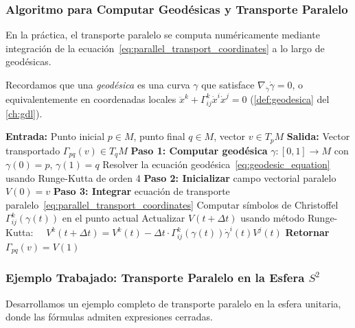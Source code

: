 \subsubsection{Algoritmo para Computar Geodésicas y Transporte Paralelo}

En la práctica, el transporte paralelo se computa numéricamente mediante integración de la ecuación~\eqref{eq:parallel_transport_coordinates} a lo largo de geodésicas.

Recordamos que una \textit{geodésica} es una curva $\gamma$ que satisface $\nabla_{\dot{\gamma}} \dot{\gamma} = 0$, o equivalentemente en coordenadas locales $\ddot{x}^k + \Gamma^k_{ij} \dot{x}^i \dot{x}^j = 0$ (\autoref{def:geodesica} del \autoref{ch:gdl}).\label{def:geodesic_attention}\label{eq:geodesic_equation}

\begin{algorithm}[H]
\caption{Cálculo de Transporte Paralelo en Variedades Riemannianas}
\label{alg:parallel_transport_computation}
\begin{algorithmic}[1]
    \State \textbf{Entrada:} Punto inicial $p \in M$, punto final $q \in M$, vector $v \in T_p M$
    \State \textbf{Salida:} Vector transportado $\Gamma_{pq}(v) \in T_q M$
    \State
    \State \textbf{Paso 1: Computar geodésica} $\gamma: [0,1] \to M$ con $\gamma(0) = p$, $\gamma(1) = q$
    \State Resolver la ecuación geodésica~\eqref{eq:geodesic_equation} usando Runge-Kutta de orden 4
    \State
    \State \textbf{Paso 2: Inicializar} campo vectorial paralelo $V(0) = v$
    \State
    \State \textbf{Paso 3: Integrar} ecuación de transporte paralelo~\eqref{eq:parallel_transport_coordinates}
        \State Computar símbolos de Christoffel $\Gamma^k_{ij}(\gamma(t))$ en el punto actual
        \State Actualizar $V(t + \Delta t)$ usando método Runge-Kutta:
        \State $\quad V^k(t + \Delta t) = V^k(t) - \Delta t \cdot \Gamma^k_{ij}(\gamma(t)) \dot{\gamma}^i(t) V^j(t)$
    \EndFor
    \State
    \State \textbf{Retornar} $\Gamma_{pq}(v) = V(1)$
\end{algorithmic}
\end{algorithm}

\subsubsection{Ejemplo Trabajado: Transporte Paralelo en la Esfera $S^2$}

Desarrollamos un ejemplo completo de transporte paralelo en la esfera unitaria, donde las fórmulas admiten expresiones cerradas.

